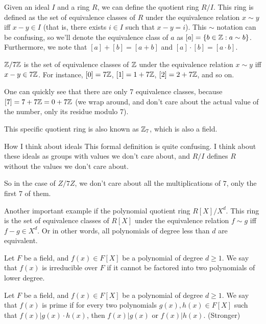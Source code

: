Given an ideal $I$ and a ring $R$, we can define the quotient ring $R/I$.
This ring is defined as the set of equivalence classes of $R$ under the equivalence relation 
$x\sim y$ iff $x-y\in I$ (that is, there exists $i\in I$ such that $x-y=i$).
This $\sim$ notation can be confusing, so we'll denote the equivalence class of $a$ as $[a]=\{b\in \mathbb{Z} :a\sim b \}$.
Furthermore, we note that $[a]+[b]=[a+b]$ and $[a]\cdot[b]=[a\cdot b]$.

\begin{example}
    $\mathbb{Z}/7\mathbb{Z}$ is the set of equivalence classes of $\mathbb{Z}$ under the equivalence relation
    $x\sim y$ iff $x-y\in 7\mathbb{Z}$. 
    For instance, $[0]=7\mathbb{Z}$, $[1]=1+7\mathbb{Z}$, $[2]=2+7\mathbb{Z}$, and so on.

    One can quickly see that there are only 7 equivalence classes, because $[7]=7+7\mathbb{Z}=0+7\mathbb{Z}$ (we wrap around, 
    and don't care about the actual value of the number, only its residue modulo 7).

    This specific quotient ring is also known as $\mathbb{Z}_7$, which is also a field.
\end{example}


\begin{bclogo}[logo=\bcinfo, couleurBarre=orange, noborder=true, couleur=white]{How I think about ideals}
    This formal definition is quite confusing. I think about these ideals as groups 
    with values we don't care about, and $R/I$ defines $R$ without 
    the values we don't care about.

    So in the case of $Z/7Z$, we don't care about 
    all the multiplications of $7$, only the first 7 of them.


    Another important example if the polynomial quotient ring $R[X]/X^d$. 
This ring is the set of equivalence classes of $R[X]$ under the equivalence relation
$f\sim g$ iff $f-g\in X^d$. Or in other words, all polynomials of degree less than $d$ are equivalent.
\end{bclogo}

\begin{definition}
    Let $F$ be a field, and $f(x)\in F[X]$ be a polynomial of degree $d\ge 1$.
    We say that $f(x)$ is irreducible over $F$ if it cannot be factored into 
    two polynomials of lower degree.
\end{definition}

\begin{definition}
    Let $F$ be a field, and $f(x)\in F[X]$ be a polynomial of degree $d\ge 1$.
    We say that $f(x)$ is prime if for every two polynomials $g(x),h(x)\in F[X]$
    such that $f(x)|g(x)\cdot h(x)$, then $f(x)|g(x)$ or $f(x)|h(x)$. (Stronger)
\end{definition}

